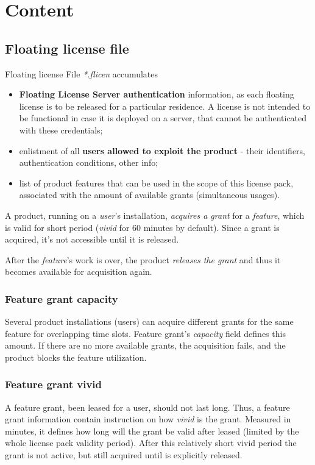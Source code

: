 \documentclass[12pt]{report}
\begin{document}
\section*{Content} \label{sec:flp-content}

\subsection*{Floating license file} \label{sec:flp-content-lic}
Floating license File \textit{*.flicen} accumulates
\begin{itemize}
  \item \textbf{Floating License Server authentication} information, as each floating license is to be released for a particular residence. A license is not intended to be functional in case it is deployed on a server, that cannot be authenticated with these credentials;
  \item enlistment of all \textbf{users allowed to exploit the product} - their identifiers, authentication conditions, other info;
  \item list of product features that can be used in the scope of this license pack, associated with the amount of available grants (simultaneous usages).
\end{itemize}

A product, running on a \textit{user}'s installation, \textit{acquires a grant} for a \textit{feature}, 
which is valid for short period (\textit{vivid} for 60 minutes by default). 
Since a grant is acquired, it's not accessible until it is released. 

After the \textit{feature}'s work is over, the product \textit{releases the grant} and thus it becomes available for acquisition again.

\subsubsection*{Feature grant capacity} \label{sec:flp-content-capacily}
Several product installations (users) can acquire different grants for the same feature for overlapping time slots. 
Feature grant's \textit{capacity} field defines this amount.
If there are no more available grants, the acquisition fails, and the product blocks the feature utilization. 

\subsubsection*{Feature grant vivid} \label{sec:flp-content-vivid}
A feature grant, been leased for a user, should not last long. 
Thus, a feature grant information contain instruction on how \textit{vivid} is the grant. 
Measured in minutes, it defines how long will the grant be valid after leased (limited by the whole license pack validity period).
After this relatively short vivid period the grant is not active, but still acquired until is explicitly released.
\end{document}
